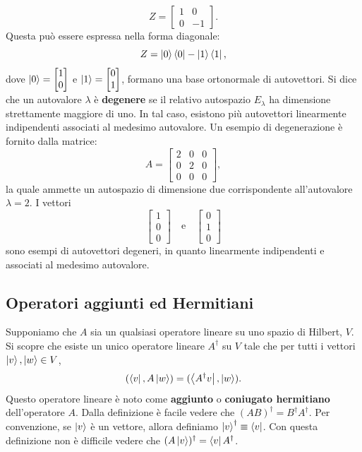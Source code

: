 \documentclass[a4paper,12pt]{report}
\theoremstyle{plain}
\begin{document}
\[
Z = 
\begin{bmatrix}
1 & 0 \\
0 & -1
\end{bmatrix}.
\]
Questa può essere espressa nella forma diagonale:
\[
Z = \ket{0}\bra{0} - \ket{1}\bra{1},
\]
dove \( \ket{0} = \begin{bmatrix} 1 \\ 0 \end{bmatrix} \) e \( \ket{1} = \begin{bmatrix} 0 \\ 1 \end{bmatrix} \), formano una base ortonormale di autovettori.
Si dice che un autovalore \(\lambda\) è \textbf{degenere} se il relativo autospazio \(E_\lambda\) ha dimensione strettamente maggiore di uno. In tal caso, esistono più autovettori linearmente indipendenti associati al medesimo autovalore. Un esempio di degenerazione è fornito dalla matrice:
\[
A = 
\begin{bmatrix}
2 & 0 & 0 \\
0 & 2 & 0 \\
0 & 0 & 0
\end{bmatrix},
\]
la quale ammette un autospazio di dimensione due corrispondente all'autovalore \(\lambda = 2\). I vettori
\[
\begin{bmatrix} 1 \\ 0 \\ 0 \end{bmatrix} \quad \text{e} \quad \begin{bmatrix} 0 \\ 1 \\ 0 \end{bmatrix}
\]
sono esempi di autovettori degeneri, in quanto linearmente indipendenti e associati al medesimo autovalore.

\subsection{Operatori aggiunti ed Hermitiani}
Supponiamo che $A$ sia un qualsiasi operatore lineare su uno spazio di Hilbert, $V$. Si scopre che esiste un unico operatore lineare $A^\dagger$ su $V$ tale che per tutti i vettori $\ket{v}, \ket{w} \in V$,
\begin{align*}
(\bra{v}, A\ket{w}) = (\bra{A^\dagger v}, \ket{w}).
\end{align*}
Questo operatore lineare è noto come \textbf{aggiunto} o \textbf{coniugato hermitiano} dell'operatore $A$. Dalla definizione è facile vedere che $(AB)^\dagger = B^\dagger A^\dagger$. Per convenzione, se $\ket{v}$ è un vettore, allora definiamo $\ket{v}^\dagger \equiv \bra{v}$. Con questa definizione non è difficile vedere che $(A\ket{v})^\dagger = \bra{v}A^\dagger$.
\end{document}

